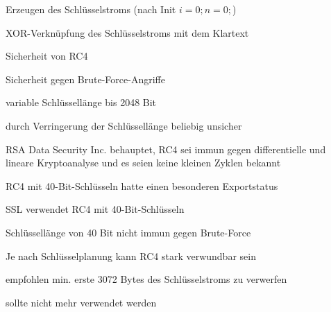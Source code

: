 \documentclass[a4paper]{article}
\begin{document}
\begin{multicols}{3}
\begin{itemize*}
\begin{enumerate*}
                  \item Erzeugen des Schlüsselstroms (nach Init $i=0;n=0;$)
                  \item XOR-Verknüpfung des Schlüsselstroms mit dem Klartext%
            \end{enumerate*}
            \item Sicherheit von RC4
            \begin{itemize*}
                  \item Sicherheit gegen Brute-Force-Angriffe
                  \item variable Schlüssellänge bis 2048 Bit
                  \item durch Verringerung der Schlüssellänge beliebig unsicher
                  \item RSA Data Security Inc. behauptet, RC4 sei immun gegen differentielle und lineare Kryptoanalyse und es seien keine kleinen Zyklen bekannt
            \end{itemize*}
            \item RC4 mit 40-Bit-Schlüsseln hatte einen besonderen Exportstatus%
            \begin{itemize*}
                  \item SSL verwendet RC4 mit 40-Bit-Schlüsseln %
                  \item Schlüssellänge von 40 Bit nicht immun gegen Brute-Force
            \end{itemize*}
            \item Je nach Schlüsselplanung kann RC4 stark verwundbar sein
            \item empfohlen min. erste 3072 Bytes des Schlüsselstroms zu verwerfen
            \item sollte nicht mehr verwendet werden%
      \end{itemize*}


\end{multicols}
\end{document}
